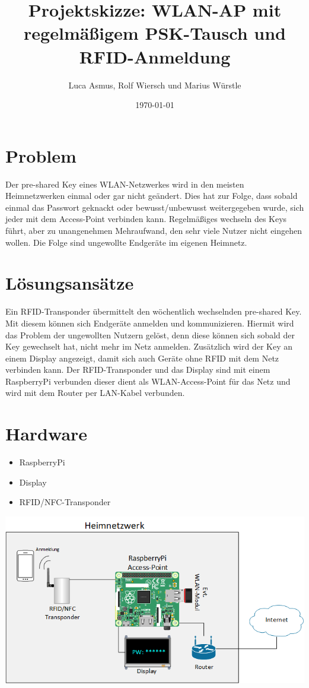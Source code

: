 \documentclass[a4paper]{article}
\title{Projektskizze: WLAN-AP mit regelmäßigem PSK-Tausch und RFID-Anmeldung}
\author{Luca Asmus, Rolf Wiersch und Marius Würstle}
\date{\today}
\begin{document}
	\maketitle
	
	
	\section{Problem}
	Der pre-shared Key eines WLAN-Netzwerkes wird in den meisten Heimnetzwerken einmal oder gar nicht geändert. Dies hat zur Folge, dass sobald einmal das Passwort geknackt oder bewusst/unbewusst weitergegeben wurde, sich jeder mit dem Access-Point verbinden kann. Regelmäßiges wechseln des Keys führt, aber zu unangenehmen Mehraufwand, den sehr viele Nutzer nicht eingehen wollen. Die Folge sind ungewollte Endgeräte im eigenen Heimnetz.
	
	\section{Lösungsansätze}
	Ein RFID-Transponder übermittelt den wöchentlich wechselnden pre-shared Key. Mit diesem können sich Endgeräte anmelden und kommunizieren. Hiermit wird das Problem der ungewollten Nutzern gelöst, denn diese können sich sobald der Key gewechselt hat, nicht mehr im Netz anmelden. Zusätzlich wird der Key an einem Display angezeigt, damit sich auch Geräte ohne RFID mit dem Netz verbinden kann. Der RFID-Transponder und das Display sind mit einem RaspberryPi verbunden dieser dient als WLAN-Access-Point für das Netz und wird mit dem Router per LAN-Kabel verbunden.
	
	\section{Hardware}
	
	\begin{itemize}
		\item RaspberryPi
		\item Display
		\item RFID/NFC-Transponder
	\end{itemize}

	\includegraphics[scale=0.6]{skizze}
\end{document}
